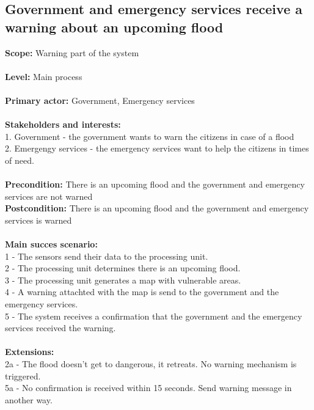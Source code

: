 \subsection{Government and emergency services receive a warning about an upcoming flood}
\textbf{Scope:} Warning part of the system\\\\
\textbf{Level:} Main process\\\\
\textbf{Primary actor:} Government, Emergency services\\\\
\textbf{Stakeholders and interests:}\\
	1. Government - the government wants to warn the citizens in case of a flood \\
	2. Emergengy services - the emergency services want to help the citizens in times of need.\\\\
\textbf{Precondition:} There is an upcoming flood and the government and emergency services are not warned\\
\textbf{Postcondition:} There is an upcoming flood and the government and emergency services is warned\\\\
\textbf{Main succes scenario:} \\
1 - The sensors send their data to the processing unit.\\
2 - The processing unit determines there is an upcoming flood.\\
3 - The processing unit generates a map with vulnerable areas.\\
4 - A warning attachted with the map is send to the government and the emergency services.\\
5 - The system receives a confirmation that the government and the emergency services received the warning.\\\\
\textbf{Extensions:} \\
2a - The flood doesn't get to dangerous, it retreats. No warning mechanism is triggered.\\
5a - No confirmation is received within 15 seconds. Send warning message in another way. 

